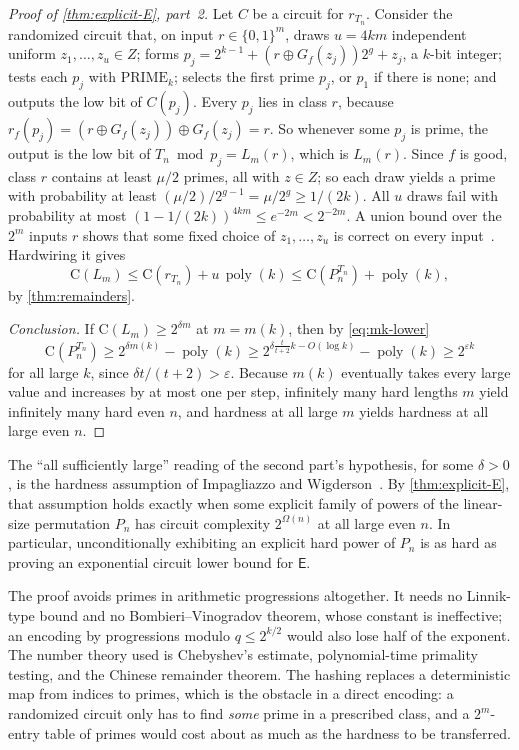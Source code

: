 \documentclass[11pt]{article}
\theoremstyle{definition}
\theoremstyle{remark}
\newcommand{\bits}{\{0,1\}}
\newcommand{\CC}{\mathrm{C}}
\newcommand{\poly}{\operatorname{poly}}
\numberwithin{equation}{section}
\begin{document}
\begin{proof}[Proof of \cref{thm:explicit-E}, part~2]
Let $C$ be a circuit for $r_{T_n}$.  Consider the randomized circuit
that, on input $r\in\bits^m$, draws $u=4km$ independent uniform
$z_1,\ldots,z_u\in Z$; forms
$p_j=2^{k-1}+(r\oplus G_f(z_j))2^g+z_j$, a $k$-bit integer; tests each
$p_j$ with $\mathrm{PRIME}_k$; selects the first prime $p_j$, or $p_1$
if there is none; and outputs the low bit of $C(p_j)$.  Every $p_j$ lies
in class $r$, because $r_f(p_j)=(r\oplus G_f(z_j))\oplus G_f(z_j)=r$.
So whenever some $p_j$ is prime, the output is the low bit of
$T_n\bmod p_j=L_m(r)$, which is $L_m(r)$.  Since $f$ is good, class $r$
contains at least $\mu/2$ primes, all with $z\in Z$; so each draw yields a
prime with probability at least $(\mu/2)/2^{g-1}=\mu/2^g\geq1/(2k)$.
All $u$ draws fail with probability at most
$(1-1/(2k))^{4km}\leq e^{-2m}<2^{-2m}$.  A union bound over the $2^m$
inputs $r$ shows that some fixed choice of $z_1,\ldots,z_u$ is correct on
every input~\cite{Adleman78}.  Hardwiring it gives
\[
  \CC(L_m)\leq\CC(r_{T_n})+u\,\poly(k)
  \leq\CC(P_n^{T_n})+\poly(k),
\]
by \cref{thm:remainders}.

\emph{Conclusion.}  If $\CC(L_m)\geq2^{\delta m}$ at $m=m(k)$, then by
\cref{eq:mk-lower}
\[
  \CC(P_n^{T_n})\geq2^{\delta m(k)}-\poly(k)
  \geq2^{\delta\frac{t}{t+2}k-O(\log k)}-\poly(k)\geq2^{\varepsilon k}
\]
for all large $k$, since $\delta t/(t+2)>\varepsilon$.  Because $m(k)$
eventually takes every large value and increases by at most one per
step, infinitely many hard lengths $m$ yield infinitely many hard even
$n$, and hardness at all large $m$ yields hardness at all large even
$n$.
\end{proof}

The ``all sufficiently large'' reading of the second part's hypothesis,
for some $\delta>0$, is the hardness assumption of Impagliazzo and
Wigderson~\cite{IW97}.  By \cref{thm:explicit-E}, that assumption holds
exactly when some explicit family of powers of the linear-size
permutation $P_n$ has circuit complexity $2^{\Omega(n)}$ at all large even
$n$.  In particular, unconditionally exhibiting an explicit hard power of
$P_n$ is as hard as proving an exponential circuit lower bound for
$\mathsf{E}$.

The proof avoids primes in arithmetic progressions altogether.  It needs
no Linnik-type bound and no Bombieri--Vinogradov theorem, whose constant
is ineffective; an encoding by progressions modulo $q\leq2^{k/2}$ would
also lose half of the exponent.  The number theory used is Chebyshev's
estimate, polynomial-time primality testing, and the Chinese remainder
theorem.  The hashing replaces a deterministic map from indices to
primes, which is the obstacle in a direct encoding: a randomized circuit
only has to find \emph{some} prime in a prescribed class, and a
$2^m$-entry table of primes would cost about as much as the hardness to
be transferred.
\end{document}
